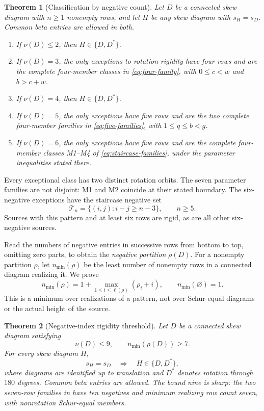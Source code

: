 \documentclass[11pt,a4paper]{amsart}
\numberwithin{equation}{section}
\theoremstyle{plain}
\newtheorem{theorem}{Theorem}[section]
\theoremstyle{definition}
\begin{document}
\begin{theorem}[Classification by negative count]\label{thm:classification}
Let \(D\) be a connected skew diagram with \(n\ge1\) nonempty rows,
and let \(H\) be any skew diagram with \(s_H=s_D\).
Common beta entries are allowed in both.
\begin{enumerate}[label=(\roman*),leftmargin=2em]
\item If \(\nu(D)\le2\), then \(H\in\{D,D^*\}\).
\item If \(\nu(D)=3\), the only exceptions to rotation rigidity have four
rows and are the complete four-member classes in
\eqref{eq:four-family}, with \(0\le c<w\) and \(b>c+w\).
\item If \(\nu(D)=4\), then \(H\in\{D,D^*\}\).
\item If \(\nu(D)=5\), the only exceptions have five rows and are the two
complete four-member families in \eqref{eq:five-families}, with
\(1\le q\le b<g\).
\item If \(\nu(D)=6\), the only exceptions have five rows and are the
complete four-member classes M1--M4 of \eqref{eq:staircase-families},
under the parameter inequalities stated there.
\end{enumerate}
\end{theorem}

Every exceptional class has two distinct rotation orbits.  The seven
parameter families are not disjoint: M1 and M2 coincide at their stated
boundary.  The six-negative exceptions have the staircase negative set
\begin{equation}\label{eq:staircase-set}
 \mathcal T_n=\{(i,j):i-j\ge n-3\},\qquad n\ge5.
\end{equation}
Sources with this pattern and at least six rows are rigid, as are all
other six-negative sources.

Read the numbers of negative entries in successive rows from bottom to
top, omitting zero parts, to obtain the \emph{negative partition}
\(\rho(D)\).  For a nonempty partition \(\rho\), let
\(n_{\min}(\rho)\) be the least number of nonempty rows in a connected
diagram realizing it.  We prove
\begin{equation}\label{eq:minimum-intro}
 n_{\min}(\rho)=1+\max_{1\le i\le\ell(\rho)}(\rho_i+i),
 \qquad n_{\min}(\varnothing)=1.
\end{equation}
This is a minimum over realizations of a pattern, not over Schur-equal
diagrams or the actual height of the source.

\begin{theorem}[Negative-index rigidity threshold]\label{thm:negative-threshold}
Let \(D\) be a connected skew diagram satisfying
\[
 \nu(D)\le9,\qquad n_{\min}(\rho(D))\ge7.
\]
For every skew diagram \(H\),
\[
 s_H=s_D\quad\Longrightarrow\quad H\in\{D,D^*\},
\]
where diagrams are identified up to translation and \(D^*\) denotes rotation through \(180\) degrees.  Common beta entries are allowed.  The bound nine is sharp: the two seven-row families in  have ten negatives and minimum realizing row count seven, with nonrotation Schur-equal members.
\end{theorem}
\end{document}
